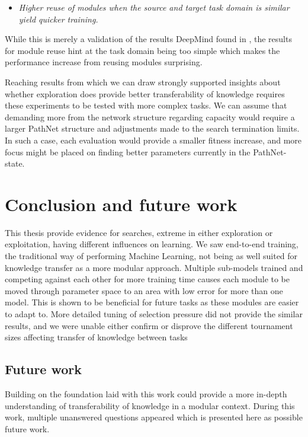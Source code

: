 \begin{itemize}
    \item \emph{Higher reuse of modules when the source and target task domain is similar yield quicker training.}
\end{itemize}
While this is merely a validation of the results DeepMind found in \cite{pathnet}, the results for module reuse hint at the task domain being too simple which makes the performance increase from reusing modules surprising. 

Reaching results from which we can draw strongly supported insights about whether exploration does provide better transferability of knowledge requires these experiments to be tested with more complex tasks. We can assume that demanding more from the network structure regarding capacity would require a larger PathNet structure and adjustments made to the search termination limits. In such a case, each evaluation would provide a smaller fitness increase, and more focus might be placed on finding better parameters currently in the PathNet-state. 

\section{Conclusion and future work}
This thesis provide evidence for searches, extreme in either exploration or exploitation, having different influences on learning. We saw end-to-end training, the traditional way of performing Machine Learning, not being as well suited for knowledge transfer as a more modular approach. Multiple sub-models trained and competing against each other for more training time causes each module to be moved through parameter space to an area with low error for more than one model. This is shown to be beneficial for future tasks as these modules are easier to adapt to. More detailed tuning of selection pressure did not provide the similar results, and we were unable either confirm or disprove the different tournament sizes affecting transfer of knowledge between tasks

\subsection{Future work}
Building on the foundation laid with this work could provide a more in-depth understanding of transferability of knowledge in a modular context. During this work, multiple unanswered questions appeared which is presented here as possible future work. 

